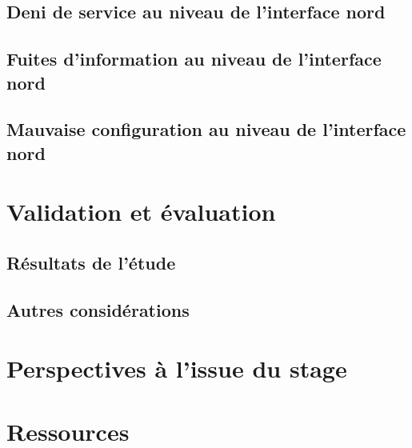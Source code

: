 \documentclass[a4paper]{article}
\begin{document}
	\subsection{Deni de service au niveau de l'interface nord}
	\subsection{Fuites d'information au niveau de l'interface nord}
	\subsection{Mauvaise configuration au niveau de l'interface nord}
\section{Validation et évaluation}
	\subsection{Résultats de l'étude}
	\subsection{Autres considérations}
\section{Perspectives à l'issue du stage}
\section{Ressources}



~
\newpage

%

%
 
%

%

%

%

%

\newpage

\nocite{*}



\end{document}
